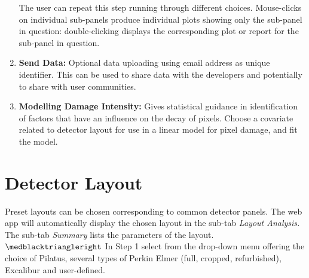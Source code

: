 \documentclass[11pt,a4paper]{article}
\begin{document}
\begin{mdframed}
\begin{enumerate}
The user can repeat this step running through different choices. Mouse-clicks on individual sub-panels produce individual plots showing only the sub-panel in question: double-clicking displays the corresponding plot or report for the sub-panel in question.

\item {\bf Send Data:} 
Optional data uploading using email address as unique identifier. This can be used to share data with the developers and potentially to share with user communities.

\item {\bf Modelling Damage Intensity:} Gives statistical guidance in identification of factors that have an influence on the decay of pixels. Choose a covariate related to detector layout for use in a linear model for pixel damage, and fit the model.


\end{enumerate}

\medskip

\end{mdframed}

\vfill\newpage

\medskip

\section{Detector Layout}\label{layout}

Preset layouts can be chosen corresponding to common detector panels. 
The web app will automatically display the chosen layout in the sub-tab \emph{Layout Analysis.} The sub-tab \emph{Summary} lists the parameters of the layout. 
\\
$\medblacktriangleright$ In Step 1 select from the drop-down menu offering the choice of Pilatus, several types of Perkin Elmer (full, cropped, refurbished), Excalibur and user-defined.
\end{document}
